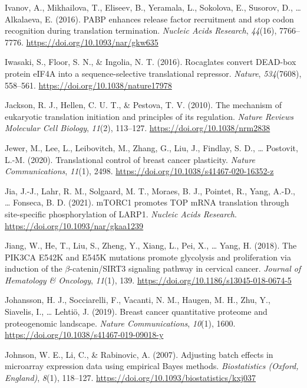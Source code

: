 \documentclass[12pt,openany]{book}
\begin{document}
\hypertarget{ref-Ivanov2016}{}
Ivanov, A., Mikhailova, T., Eliseev, B., Yeramala, L., Sokolova, E.,
Susorov, D., \ldots{} Alkalaeva, E. (2016). PABP enhances release factor
recruitment and stop codon recognition during translation termination.
\emph{Nucleic Acids Research}, \emph{44}(16), 7766--7776.
\url{https://doi.org/10.1093/nar/gkw635}

\hypertarget{ref-Iwasaki2016}{}
Iwasaki, S., Floor, S. N., \& Ingolia, N. T. (2016). Rocaglates convert
DEAD-box protein eIF4A into a sequence-selective translational
repressor. \emph{Nature}, \emph{534}(7608), 558--561.
\url{https://doi.org/10.1038/nature17978}

\hypertarget{ref-Jackson2010}{}
Jackson, R. J., Hellen, C. U. T., \& Pestova, T. V. (2010). The
mechanism of eukaryotic translation initiation and principles of its
regulation. \emph{Nature Reviews Molecular Cell Biology}, \emph{11}(2),
113--127. \url{https://doi.org/10.1038/nrm2838}

\hypertarget{ref-Jewer2020}{}
Jewer, M., Lee, L., Leibovitch, M., Zhang, G., Liu, J., Findlay, S. D.,
\ldots{} Postovit, L.-M. (2020). Translational control of breast cancer
plasticity. \emph{Nature Communications}, \emph{11}(1), 2498.
\url{https://doi.org/10.1038/s41467-020-16352-z}

\hypertarget{ref-Jia2021}{}
Jia, J.-J., Lahr, R. M., Solgaard, M. T., Moraes, B. J., Pointet, R.,
Yang, A.-D., \ldots{} Fonseca, B. D. (2021). mTORC1 promotes TOP mRNA
translation through site-specific phosphorylation of LARP1.
\emph{Nucleic Acids Research}.
\url{https://doi.org/10.1093/nar/gkaa1239}

\hypertarget{ref-Jiang2018}{}
Jiang, W., He, T., Liu, S., Zheng, Y., Xiang, L., Pei, X., \ldots{}
Yang, H. (2018). The PIK3CA E542K and E545K mutations promote glycolysis
and proliferation via induction of the \(\beta\)-catenin/SIRT3 signaling
pathway in cervical cancer. \emph{Journal of Hematology \& Oncology},
\emph{11}(1), 139. \url{https://doi.org/10.1186/s13045-018-0674-5}

\hypertarget{ref-Johansson2019}{}
Johansson, H. J., Socciarelli, F., Vacanti, N. M., Haugen, M. H., Zhu,
Y., Siavelis, I., \ldots{} Lehtiö, J. (2019). Breast cancer quantitative
proteome and proteogenomic landscape. \emph{Nature Communications},
\emph{10}(1), 1600. \url{https://doi.org/10.1038/s41467-019-09018-y}

\hypertarget{ref-Johnson2007}{}
Johnson, W. E., Li, C., \& Rabinovic, A. (2007). Adjusting batch effects
in microarray expression data using empirical Bayes methods.
\emph{Biostatistics (Oxford, England)}, \emph{8}(1), 118--127.
\url{https://doi.org/10.1093/biostatistics/kxj037}
\end{document}

